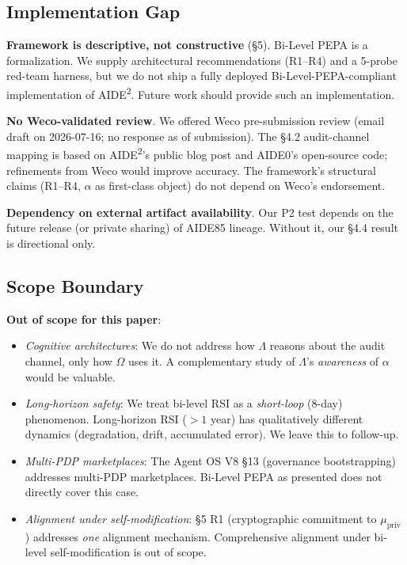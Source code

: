 \subsection{Implementation Gap}

\textbf{Framework is descriptive, not constructive} (\S5). Bi-Level PEPA is a formalization. We supply architectural recommendations (R1--R4) and a 5-probe red-team harness, but we do not ship a fully deployed Bi-Level-PEPA-compliant implementation of AIDE\textsuperscript{2}. Future work should provide such an implementation.

\textbf{No Weco-validated review}. We offered Weco pre-submission review (email draft on 2026-07-16; no response as of submission). The \S4.2 audit-channel mapping is based on AIDE\textsuperscript{2}'s public blog post and AIDE0's open-source code; refinements from Weco would improve accuracy. The framework's structural claims (R1--R4, $\alpha$ as first-class object) do not depend on Weco's endorsement.

\textbf{Dependency on external artifact availability}. Our P2 test depends on the future release (or private sharing) of AIDE85 lineage. Without it, our \S4.4 result is directional only.

\subsection{Scope Boundary}

\textbf{Out of scope for this paper}:
\begin{itemize}
    \item \emph{Cognitive architectures}: We do not address how $\Lambda$ reasons about the audit channel, only how $\Omega$ uses it. A complementary study of $\Lambda$'s \emph{awareness} of $\alpha$ would be valuable.
    \item \emph{Long-horizon safety}: We treat bi-level RSI as a \emph{short-loop} (8-day) phenomenon. Long-horizon RSI ($>1$ year) has qualitatively different dynamics (degradation, drift, accumulated error). We leave this to follow-up.
    \item \emph{Multi-PDP marketplaces}: The Agent OS V8 \S13 (governance bootstrapping) addresses multi-PDP marketplaces. Bi-Level PEPA as presented does not directly cover this case.
    \item \emph{Alignment under self-modification}: \S5 R1 (cryptographic commitment to $\mu_{\text{priv}}$) addresses \emph{one} alignment mechanism. Comprehensive alignment under bi-level self-modification is out of scope.
\end{itemize}

